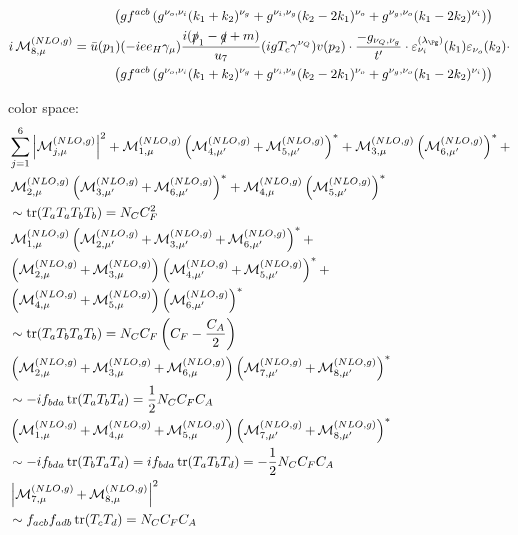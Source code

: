 \begin{align}
 &\hspace{30pt}\left(gf^{acb}\left(g^{\nu_o,\nu_i}(k_1+k_2)^{\nu_g}+g^{\nu_i,\nu_g}(k_2-2k_1)^{\nu_o}+g^{\nu_g,\nu_o}(k_1-2k_2)^{\nu_i}\right)\right)\\
i\Md^{(NLO,g)}_{8,\mu} &= \bar u(p_1)(-i e e_H \gamma_\mu)\frac{i(\slashed{p}_1-\slashed{q}+m)}{u_7}(igT_c\gamma^{\nu_Q})v(p_2)\cdot\frac{-g_{\nu_Q,\nu_g}}{t'}\cdot\varepsilon^{(\lambda_{\Pg})}_{\nu_i}(k_1)\varepsilon_{\nu_o}(k_2)\cdot\nonumber\\
 &\hspace{30pt}\left(gf^{acb}\left(g^{\nu_o,\nu_i}(k_1+k_2)^{\nu_g}+g^{\nu_i,\nu_g}(k_2-2k_1)^{\nu_o}+g^{\nu_g,\nu_o}(k_1-2k_2)^{\nu_i}\right)\right)
\end{align}

color space:
\begin{align}
&\sum\limits_{j=1}^6\left|\operatorname{\mathcal M}^{(NLO,g)}_{j,\mu}\right|^2 + \operatorname{\mathcal M}^{(NLO,g)}_{1,\mu}\left(\operatorname{\mathcal M}^{(NLO,g)}_{4,\mu'}+\operatorname{\mathcal M}^{(NLO,g)}_{5,\mu'}\right)^*+\operatorname{\mathcal M}^{(NLO,g)}_{3,\mu}\left(\operatorname{\mathcal M}^{(NLO,g)}_{6,\mu'}\right)^*+\nonumber\\
&\operatorname{\mathcal M}^{(NLO,g)}_{2,\mu}\left(\operatorname{\mathcal M}^{(NLO,g)}_{3,\mu'}+\operatorname{\mathcal M}^{(NLO,g)}_{6,\mu'}\right)^*+\operatorname{\mathcal M}^{(NLO,g)}_{4,\mu}\left(\operatorname{\mathcal M}^{(NLO,g)}_{5,\mu'}\right)^*\nonumber\\
&\sim\operatorname{\text{tr}}(T_aT_aT_bT_b) = N_C C_F^2\\
&\operatorname{\mathcal M}^{(NLO,g)}_{1,\mu}\left(\operatorname{\mathcal M}^{(NLO,g)}_{2,\mu'}+\operatorname{\mathcal M}^{(NLO,g)}_{3,\mu'}+\operatorname{\mathcal M}^{(NLO,g)}_{6,\mu'}\right)^*+\nonumber\\
&\left(\operatorname{\mathcal M}^{(NLO,g)}_{2,\mu}+\operatorname{\mathcal M}^{(NLO,g)}_{3,\mu}\right)\left(\operatorname{\mathcal M}^{(NLO,g)}_{4,\mu'}+\operatorname{\mathcal M}^{(NLO,g)}_{5,\mu'}\right)^*+\nonumber\\
&\left(\operatorname{\mathcal M}^{(NLO,g)}_{4,\mu}+\operatorname{\mathcal M}^{(NLO,g)}_{5,\mu}\right)\left(\operatorname{\mathcal M}^{(NLO,g)}_{6,\mu'}\right)^*\nonumber\\
&\sim\operatorname{\text{tr}}(T_aT_bT_aT_b) = N_C C_F \left(C_F - \frac{C_A}{2}\right)\\
&\left(\operatorname{\mathcal M}^{(NLO,g)}_{2,\mu}+\operatorname{\mathcal M}^{(NLO,g)}_{3,\mu}+\operatorname{\mathcal M}^{(NLO,g)}_{6,\mu}\right)\left(\operatorname{\mathcal M}^{(NLO,g)}_{7,\mu'}+\operatorname{\mathcal M}^{(NLO,g)}_{8,\mu'}\right)^*\nonumber\\
&\sim-if_{bda}\operatorname{\text{tr}}(T_aT_bT_d) = \frac 1 2 N_C C_F C_A\\
&\left(\operatorname{\mathcal M}^{(NLO,g)}_{1,\mu}+\operatorname{\mathcal M}^{(NLO,g)}_{4,\mu}+\operatorname{\mathcal M}^{(NLO,g)}_{5,\mu}\right)\left(\operatorname{\mathcal M}^{(NLO,g)}_{7,\mu'}+\operatorname{\mathcal M}^{(NLO,g)}_{8,\mu'}\right)^*\nonumber\\
&\sim-if_{bda}\operatorname{\text{tr}}(T_bT_aT_d) = if_{bda}\operatorname{\text{tr}}(T_aT_bT_d)=-\frac 1 2 N_C C_F C_A\\
&\left|\operatorname{\mathcal M}^{(NLO,g)}_{7,\mu}+\operatorname{\mathcal M}^{(NLO,g)}_{8,\mu}\right|^2 \nonumber\\
&\sim f_{acb}f_{adb}\operatorname{\text{tr}}(T_cT_d) = N_C C_F C_A
\end{align}

